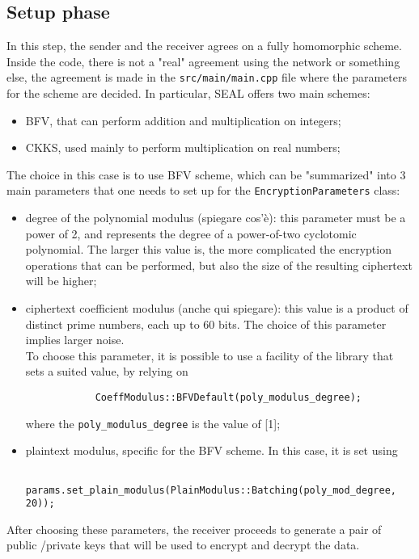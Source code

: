 \documentclass[12pt]{extarticle}
\begin{document}
\subsection{Setup phase}
In this step, the sender and the receiver agrees on a fully homomorphic scheme.\\
Inside the code, there is not a "real" agreement using the network or something else, the agreement is made in the \texttt{src/main/main.cpp} file where the parameters for the scheme are decided. In particular, SEAL offers two main schemes:
\begin{itemize}
	\item BFV, that can perform addition and multiplication on integers;
	\item CKKS, used mainly to perform multiplication on real numbers;
\end{itemize}
The choice in this case is to use BFV scheme, which can be "summarized" into 3 main parameters that one needs to set up for the \texttt{EncryptionParameters} class:
\begin{itemize}
	\item degree of the polynomial modulus (spiegare cos'è): this parameter must be a power of 2, and represents the degree of a power-of-two cyclotomic polynomial. The larger this value is, the more complicated the encryption operations that can be performed, but also the size of the resulting ciphertext will be higher;
	\item ciphertext coefficient modulus (anche qui spiegare): this value is a product of distinct prime numbers, each up to 60 bits. The choice of this parameter implies larger noise.\\
	To choose this parameter, it is possible to use a facility of the library that sets a suited value, by relying on 
		\begin{lstlisting}
			CoeffModulus::BFVDefault(poly_modulus_degree);
		\end{lstlisting}
	where the \texttt{poly\_modulus\_degree} is the value of [1];
	\item plaintext modulus, specific for the BFV scheme. In this case, it is set using 
        \begin{lstlisting}
        params.set_plain_modulus(PlainModulus::Batching(poly_mod_degree, 20));
        \end{lstlisting}
\end{itemize}
After choosing these parameters, the receiver proceeds to generate a pair of public /private keys that will be used to encrypt and decrypt the data.\\
\end{document}
